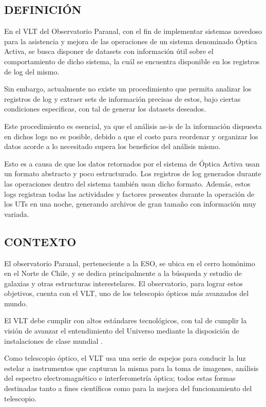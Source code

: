
\subsection{DEFINICIÓN}

En el VLT del Observatorio Paranal, con el fin de implementar sistemas novedoso para la asistencia y mejora de las operaciones de un sistema denominado Óptica Activa, se busca disponer de datasets con información útil sobre el comportamiento de dicho sistema, la cuál se encuentra disponible en los registros de log del mismo.

Sin embargo, actualmente no existe un procedimiento que permita analizar los registros de log y extraer sets de información precisas de estos, bajo ciertas condiciones especificas, con tal de generar los datasets deseados. 

Este procedimiento es esencial, ya que el análisis as-is de la información dispuesta en dichos logs no es posible, debido a que el costo para reordenar y organizar los datos acorde a lo necesitado supera los beneficios del análisis mismo.

Esto es a causa de que los datos retornados por el sistema de Óptica Activa usan un formato abstracto y poco estructurado. Los registros de log generados durante las operaciones dentro del sistema también usan dicho formato. Además, estos logs registran todas las actividades y factores presentes durante la operación de los UTs en una noche, generando archivos de gran tamaño con información muy variada.

\subsection{CONTEXTO}

El observatorio Paranal, perteneciente a la ESO, se ubica en el cerro homónimo en el Norte de Chile, y se dedica principalmente a la búsqueda y estudio de galaxias y otras estructuras interestelares. El observatorio, para lograr estos objetivos, cuenta con el VLT, uno de los telescopio ópticos más avanzados del mundo\cite{eso1998vlt}.

El VLT debe cumplir con altos estándares tecnológicos, con tal de cumplir la visión de avanzar el entendimiento del Universo mediante la disposición de instalaciones de clase mundial \cite{eso1998vlt}.

Como telescopio óptico, el VLT usa una serie de espejos para conducir la luz estelar a instrumentos que capturan la misma para la toma de imagenes, análisis del espectro electromagnético e interferometría óptica; todos estas formas destinadas tanto a fines científicos como para la mejora del funcionamiento del telescopio\cite{eso1998vlt}.

